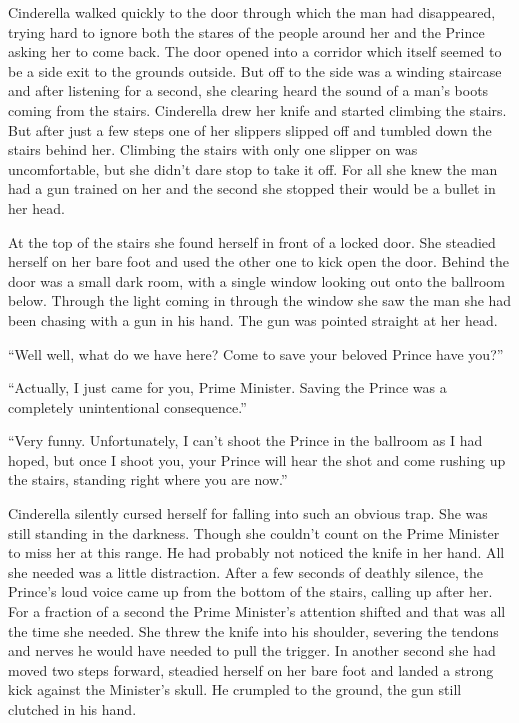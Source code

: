 \documentclass[11pt,letterpaper]{article}
\begin{document}
Cinderella walked quickly to the door through which the man had disappeared, trying hard to ignore both the stares of the people around her and the Prince asking her to come back. The door opened into a corridor which itself seemed to be a side exit to the grounds outside. But off to the side was a winding staircase and after listening for a second, she clearing heard the sound of a man's boots coming from the stairs. Cinderella drew her knife and started climbing the stairs. But after just a few steps one of her slippers slipped off and tumbled down the stairs behind her. Climbing the stairs with only one slipper on was uncomfortable, but she didn't dare stop to take it off. For all she knew the man had a gun trained on her and the second she stopped their would be a bullet in her head.

At the top of the stairs she found herself in front of a locked door. She steadied herself on her bare foot and used the other one to kick open the door. Behind the door was a small dark room, with a single window looking out onto the ballroom below. Through the light coming in through the window she saw the man she had been chasing with a gun in his hand. The gun was pointed straight at her head.

``Well well, what do we have here? Come to save your beloved Prince have you?''

``Actually, I just came for you, Prime Minister. Saving the Prince was a completely unintentional consequence.''

``Very funny. Unfortunately, I can't shoot the Prince in the ballroom as I had hoped, but once I shoot you, your Prince will hear the shot and come rushing up the stairs, standing right where you are now.''

Cinderella silently cursed herself for falling into such an obvious trap. She was still standing in the darkness. Though she couldn't count on the Prime Minister to miss her at this range. He had probably not noticed the knife in her hand. All she needed was a little distraction. After a few seconds of deathly silence, the Prince's loud voice came up from the bottom of the stairs, calling up after her. For a fraction of a second the Prime Minister's attention shifted and that was all the time she needed. She threw the knife into his shoulder, severing the tendons and nerves he would have needed to pull the trigger. In another second she had moved two steps forward, steadied herself on her bare foot and landed a strong kick against the Minister's skull. He crumpled to the ground, the gun still clutched in his hand.
\end{document}
